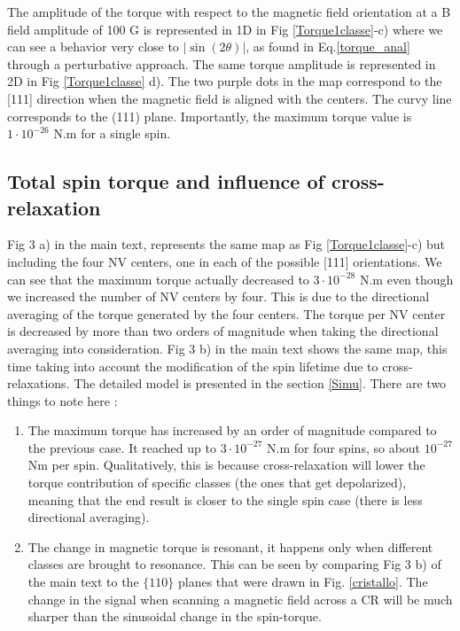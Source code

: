 \documentclass[preprintnumbers,amsmath,amssymb,onecolumn,12pt]{revtex4}
\begin{document}
The amplitude of the torque with respect to the magnetic field orientation at a B field amplitude of 100 G is represented in 1D in Fig \ref{Torque1classe}-c) where we can see a behavior very close to $|\sin(2\theta)|$, as found in Eq.\ref{torque_anal} through a perturbative approach. The same torque amplitude is represented in 2D in Fig \ref{Torque1classe} d). The two purple dots in the map correspond to the [111] direction when the magnetic field is aligned with the centers. The curvy line corresponds to the (111) plane. Importantly, the maximum torque value is $1\cdot 10^{-26}$ N.m for a single spin.

\subsection{Total spin torque and influence of cross-relaxation}


Fig 3 a) in the main text, represents the same map as Fig \ref{Torque1classe}-c) but including the four NV centers, one in each of the possible [111] orientations. We can see that the maximum torque actually decreased to $3\cdot 10^{-28}$ N.m even though we increased the number of NV centers by four. This is due to the directional averaging of the torque generated by the four centers. The torque per NV center is decreased by more than two orders of magnitude when taking the directional averaging into consideration.
Fig 3 b) in the main text shows the same map, this time taking into account the modification of the spin lifetime due to cross-relaxations. The detailed model is presented in the section \ref{Simu}.
There are two things to note here : 
\begin{enumerate}
\item The maximum torque has increased by an order of magnitude compared to the previous case. It reached up to $3\cdot 10^{-27}$ N.m for four spins, so about $10^{-27}$ Nm per spin. Qualitatively, this is because cross-relaxation will lower the torque contribution of specific classes (the ones that get depolarized), meaning that the end result is closer to the single spin case (there is less directional averaging).
\item The change in magnetic torque is resonant, it happens only when different classes are brought to resonance. This can be seen by comparing Fig 3 b) of the main text to the $\{ 110 \}$ planes that were drawn in Fig. \ref{cristallo}. The change in the signal when scanning a magnetic field across a CR will be much sharper than the sinusoidal change in the spin-torque.
\end{enumerate} 
\end{document}
